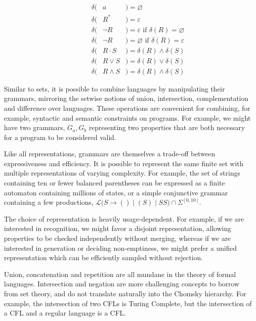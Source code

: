 \begin{multicols}{2}
\begin{eqnarray*}
    \phantom{---}\delta(& a           &)= \varnothing                                      \\
    \phantom{---}\delta(& R^*         &)= \varepsilon                                      \\
    \phantom{---}\delta(& \neg R      &)= \varepsilon \text{ if } \delta(R) = \varnothing  \\
    \phantom{---}\delta(& \neg R      &)= \varnothing \text{ if } \delta(R) = \varepsilon  \\
    \phantom{---}\delta(& R\cdot S    &)= \delta(R) \land \delta(S)                        \\
    \phantom{---}\delta(& R\vee S     &)= \delta(R) \vee  \delta(S)                        \\
    \phantom{---}\delta(& R\land S    &)= \delta(R) \land \delta(S)
  \end{eqnarray*}
\end{multicols}

Similar to sets, it is possible to combine languages by manipulating their grammars, mirroring the setwise notions of union, intersection, complementation and difference over languages. These operations are convenient for combining, for example, syntactic and semantic constraints on programs. For example, we might have two grammars, $G_a, G_b$ representing two properties that are both necessary for a program to be considered valid. %

Like all representations, grammars are themselves a trade-off between expressiveness and efficiency. It is possible to represent the same finite set with multiple representations of varying complexity. For example, the set of strings containing ten or fewer balanced parentheses can be expressed as a finite automaton containing millions of states, or a simple conjunctive grammar containing a few productions, $\mathcal{L}\Big(S \rightarrow ( ) \mid (S) \mid S S \Big) \cap \Sigma^{[0,10]}$.

The choice of representation is heavily usage-dependent. For example, if we are interested in recognition, we might favor a disjoint representation, allowing properties to be checked independently without merging, whereas if we are interested in generation or deciding non-emptiness, we might prefer a unified representation which can be efficiently sampled without rejection.

Union, concatenation and repetition are all mundane in the theory of formal languages. Intersection and negation are more challenging concepts to borrow from set theory, and do not translate naturally into the Chomsky hierarchy. For example, the intersection of two CFLs is Turing Complete, but the intersection of a CFL and a regular language is a CFL.

